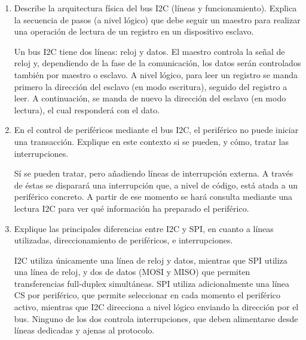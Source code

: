 \documentclass[svgnames,spanish,11pt,a4paper]{article}
\newcounter{solution}
\begin{document}
\begin{enumerate}
            
        \item Describe la arquitectura física del bus I2C (líneas y funcionamiento). Explica la secuencia de pasos (a nivel lógico) que debe seguir un maestro para realizar una operación de lectura de un registro en un dispositivo esclavo.
        
            \begin{solution}
                Un bus I2C tiene dos líneas: reloj y datos. El maestro controla la señal de reloj y, dependiendo de la fase de la comunicación, los datos serán controlados también por maestro o esclavo. A nivel lógico, para leer un registro se manda primero la dirección del esclavo (en modo escritura), seguido del registro a leer. A continuación, se manda de nuevo la dirección del esclavo (en modo lectura), el cual responderá con el dato.
            \end{solution}

        \item En el control de periféricos mediante el bus I2C, el periférico no puede iniciar una transacción. Explique en este contexto si se pueden, y cómo, tratar las interrupciones.
        
            \begin{solution}
                Sí se pueden tratar, pero añadiendo líneas de interrupción externa. A través de éstas se disparará una interrupción que, a nivel de código, está atada a un periférico concreto. A partir de ese momento se hará consulta mediante una lectura I2C para ver qué información ha preparado el periférico.
            \end{solution}


        \item Explique las principales diferencias entre I2C y SPI, en cuanto a líneas utilizadas, direccionamiento de periféricos, e interrupciones.
        
            \begin{solution}
                I2C utiliza únicamente una línea de reloj y datos, mientras que SPI utiliza una línea de reloj, y dos de datos (MOSI y MISO) que permiten transferencias full-duplex simultáneas. SPI utiliza adicionalmente una línea CS por periférico, que permite seleccionar en cada momento el periférico activo, mientras que I2C direcciona a nivel lógico enviando la dirección por el bus. Ninguno de los dos controla interrupciones, que deben alimentarse desde líneas dedicadas y ajenas al protocolo.
            \end{solution}




\end{enumerate}
\end{document}
